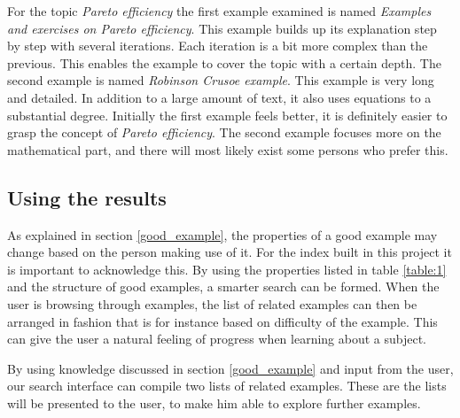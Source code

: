 For the topic \textit{Pareto efficiency} the first example examined is named \textit{Examples and exercises on Pareto efficiency}. This example builds up its explanation step by step with several iterations. Each iteration is a bit more complex than the previous. This enables the example to cover the topic with a certain depth. The second example is named \textit{Robinson Crusoe example}. This example is very long and detailed. In addition to a large amount of text, it also uses equations to a substantial degree. Initially the first example feels better, it is definitely easier to grasp the concept of \textit{Pareto efficiency}. The second example focuses more on the mathematical part, and there will most likely exist some persons who prefer this. 

\subsection{Using the results}

As explained in section \ref{good_example}, the properties of a good example may change based on the person making use of it. For the index built in this project it is important to acknowledge this. By using the properties listed in table \ref{table:1} and the structure of good examples, a smarter search can be formed. When the user is browsing through examples, the list of related examples can then be arranged in fashion that is for instance based on difficulty of the example. This can give the user a natural feeling of progress when learning about a subject.

By using knowledge discussed in section \ref{good_example} and input from the user, our search interface can compile two lists of related examples. These are the lists will be presented to the user, to make him able to explore further examples. 



\cleardoublepage